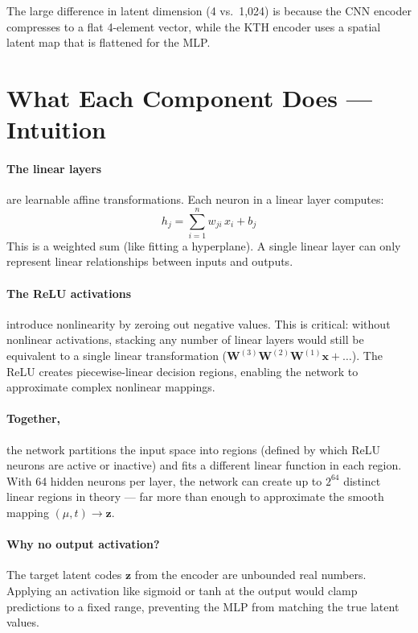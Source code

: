 \documentclass[11pt,a4paper]{article}
\newcommand{\bz}{\mathbf{z}}
\newcommand{\bx}{\mathbf{x}}
\newcommand{\bW}{\mathbf{W}}
\begin{document}
The large difference in latent dimension (4 vs.\ 1{,}024) is because the
CNN encoder compresses to a flat 4-element vector, while the KTH
encoder uses a spatial latent map that is flattened for the MLP.

\section{What Each Component Does --- Intuition}

\paragraph{The linear layers} are learnable affine transformations.
Each neuron in a linear layer computes:
\[
  h_j = \sum_{i=1}^{n} w_{ji}\,x_i + b_j
\]
This is a weighted sum (like fitting a hyperplane).  A single linear
layer can only represent linear relationships between inputs and
outputs.

\paragraph{The ReLU activations} introduce nonlinearity by zeroing out
negative values.  This is critical: without nonlinear activations,
stacking any number of linear layers would still be equivalent to a
single linear transformation ($\bW^{(3)}\bW^{(2)}\bW^{(1)}\bx + \ldots$).
The ReLU creates piecewise-linear decision regions, enabling the network
to approximate complex nonlinear mappings.

\paragraph{Together,} the network partitions the input space into
regions (defined by which ReLU neurons are active or inactive) and
fits a different linear function in each region.  With 64 hidden
neurons per layer, the network can create up to $2^{64}$ distinct
linear regions in theory --- far more than enough to approximate
the smooth mapping $(\mu, t) \to \bz$.

\paragraph{Why no output activation?}
The target latent codes $\bz$ from the encoder are unbounded real
numbers.  Applying an activation like sigmoid or tanh at the output
would clamp predictions to a fixed range, preventing the MLP from
matching the true latent values.
\end{document}
